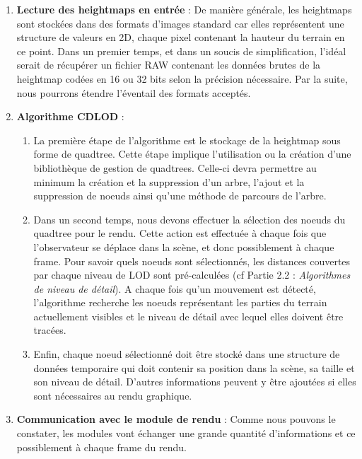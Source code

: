 \documentclass[12pt]{report}
\begin{document}
\begin{enumerate}
    \item \textbf{Lecture des heightmaps en entrée} : De manière générale, les heightmaps sont stockées dans des formats d'images standard car elles représentent une structure de valeurs en 2D, chaque pixel contenant la hauteur du terrain en ce point. Dans un premier temps, et dans un soucis de simplification, l'idéal serait de récupérer un fichier RAW contenant les données brutes de la heightmap codées en 16 ou 32 bits selon la précision nécessaire. Par la suite, nous pourrons étendre l'éventail des formats acceptés.
    
    \item \textbf{Algorithme CDLOD} :
    \begin{enumerate}
        \item La première étape de l'algorithme est le stockage de la heightmap sous forme de quadtree. Cette étape implique l'utilisation ou la création d'une bibliothèque de gestion de quadtrees. Celle-ci devra permettre au minimum la création et la suppression d'un arbre, l'ajout et la suppression de noeuds ainsi qu'une méthode de parcours de l'arbre.
        \item Dans un second temps, nous devons effectuer la sélection des noeuds du quadtree pour le rendu. Cette action est effectuée à chaque fois que l'observateur se déplace dans la scène, et donc possiblement à chaque frame. Pour savoir quels noeuds sont sélectionnés, les distances couvertes par chaque niveau de LOD sont pré-calculées (cf Partie 2.2 : \textit{Algorithmes de niveau de détail}). A chaque fois qu'un mouvement est détecté, l'algorithme recherche les noeuds représentant les parties du terrain actuellement visibles et le niveau de détail avec lequel elles doivent être tracées.
        \item Enfin, chaque noeud sélectionné doit être stocké dans une structure de données temporaire qui doit contenir sa position dans la scène, sa taille et son niveau de détail. D'autres informations peuvent y être ajoutées si elles sont nécessaires au rendu graphique.
    \end{enumerate}
    
    \item \textbf{Communication avec le module de rendu} : Comme nous pouvons le constater, les modules vont échanger une grande quantité d'informations et ce possiblement à chaque frame du rendu.
    

\end{enumerate}
\end{document}
